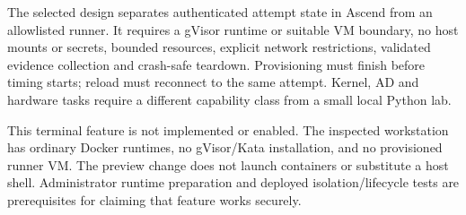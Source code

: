 The selected design separates authenticated attempt state in Ascend from an
allowlisted runner. It requires a gVisor runtime or suitable VM boundary, no host
mounts or secrets, bounded resources, explicit network restrictions, validated
evidence collection and crash-safe teardown. Provisioning must finish before
timing starts; reload must reconnect to the same attempt. Kernel, AD and hardware
tasks require a different capability class from a small local Python lab.

This terminal feature is not implemented or enabled. The inspected workstation
has ordinary Docker runtimes, no gVisor/Kata installation, and no provisioned
runner VM. The preview change does not launch containers or substitute a host
shell. Administrator runtime preparation and deployed isolation/lifecycle tests
are prerequisites for claiming that feature works securely.
